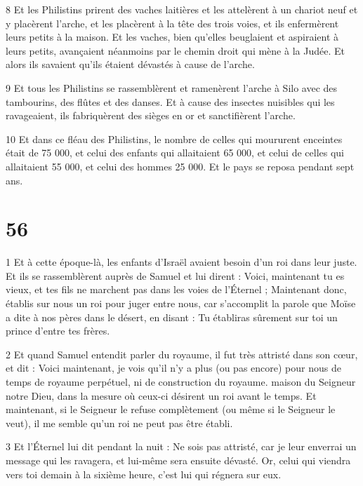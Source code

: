 \par 8 Et les Philistins prirent des vaches laitières et les attelèrent à un chariot neuf et y placèrent l'arche, et les placèrent à la tête des trois voies, et ils enfermèrent leurs petits à la maison. Et les vaches, bien qu'elles beuglaient et aspiraient à leurs petits, avançaient néanmoins par le chemin droit qui mène à la Judée. Et alors ils savaient qu’ils étaient dévastés à cause de l’arche.

\par 9 Et tous les Philistins se rassemblèrent et ramenèrent l'arche à Silo avec des tambourins, des flûtes et des danses. Et à cause des insectes nuisibles qui les ravageaient, ils fabriquèrent des sièges en or et sanctifièrent l'arche.

\par 10 Et dans ce fléau des Philistins, le nombre de celles qui moururent enceintes était de 75 000, et celui des enfants qui allaitaient 65 000, et celui de celles qui allaitaient 55 000, et celui des hommes 25 000. Et le pays se reposa pendant sept ans.

\chapter{56}

\par 1 Et à cette époque-là, les enfants d'Israël avaient besoin d'un roi dans leur juste. Et ils se rassemblèrent auprès de Samuel et lui dirent : Voici, maintenant tu es vieux, et tes fils ne marchent pas dans les voies de l'Éternel ; Maintenant donc, établis sur nous un roi pour juger entre nous, car s'accomplit la parole que Moïse a dite à nos pères dans le désert, en disant : Tu établiras sûrement sur toi un prince d'entre tes frères.

\par 2 Et quand Samuel entendit parler du royaume, il fut très attristé dans son cœur, et dit : Voici maintenant, je vois qu'il n'y a plus (ou pas encore) pour nous de temps de royaume perpétuel, ni de construction du royaume. maison du Seigneur notre Dieu, dans la mesure où ceux-ci désirent un roi avant le temps. Et maintenant, si le Seigneur le refuse complètement (ou même si le Seigneur le veut), il me semble qu'un roi ne peut pas être établi.

\par 3 Et l'Éternel lui dit pendant la nuit : Ne sois pas attristé, car je leur enverrai un message qui les ravagera, et lui-même sera ensuite dévasté. Or, celui qui viendra vers toi demain à la sixième heure, c'est lui qui régnera sur eux.

